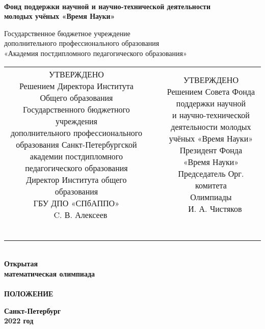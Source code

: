 \thispagestyle{empty}

\begin{center} \large\bf \ \\
	Фонд поддержки научной и научно-технической деятельности \\
	молодых учёных «Время Науки» \bigskip

	Государственное бюджетное учреждение \\
	дополнительного профессионального образования \\
	«Академия постдипломного педагогического образования» \bigskip

\normalsize
\begin{tabular}{ccc}
	\makecell[l]{
		УТВЕРЖДЕНО \\
		Решением Директора Института \\
		Общего образования \\
		Государственного бюджетного учреждения \\
		дополнительного профессионального \\
		образования Санкт-Петербургской \\
		академии постдипломного \\
		педагогического образования \bigskip \\
		Директор Института общего образования \\
		ГБУ ДПО «СПбАППО» \medskip \\
		\underline{\hspace{2.5cm}}\ \ C. В. Алексеев
	} & \hspace{0.05cm} &
	\makecell[r]{
		УТВЕРЖДЕНО \\
		Решением Совета Фонда \\
		поддержки научной \\
		и научно-технической \\
		деятельности молодых \\
		учёных «Время Науки» \bigskip \\
		Президент Фонда \\
		«Время Науки» \\
		Председатель Орг. комитета \\
		Олимпиады \medskip \\
		\underline{\hspace{2.5cm}}\ \ И. А. Чистяков
	} \\ \ & \ \\
	\makecell[l]{«\underline{\hspace{1.25cm}}»\ 
		\underline{\hspace{1.75cm}}\ 
		2022 г.}
\end{tabular} \end{center}

\vspace{0.7cm}

\begin{center} {\LARGE\bf \ \\
	Открытая \\
	математическая олимпиада \\
	\mns \\ [1 cm]
	ПОЛОЖЕНИЕ}
\end{center}

\vfill

\begin{center} \bf
	Санкт-Петербург \\
	2022 год
\end{center}

\newpage
